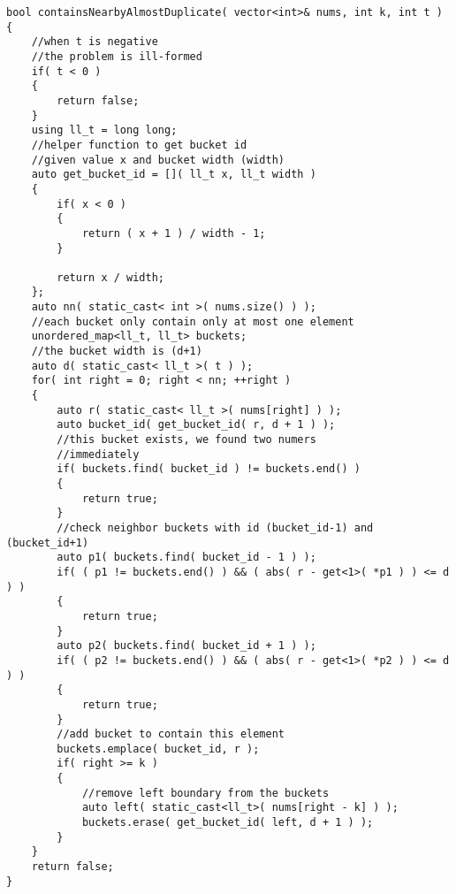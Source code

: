 \begin{lstlisting}[style=customc, caption={Buckets Sort}]
bool containsNearbyAlmostDuplicate( vector<int>& nums, int k, int t )
{
    //when t is negative
    //the problem is ill-formed
    if( t < 0 )
    {
        return false;
    }
    using ll_t = long long;
    //helper function to get bucket id
    //given value x and bucket width (width)
    auto get_bucket_id = []( ll_t x, ll_t width )
    {
        if( x < 0 )
        {
            return ( x + 1 ) / width - 1;
        }

        return x / width;
    };
    auto nn( static_cast< int >( nums.size() ) );
    //each bucket only contain only at most one element
    unordered_map<ll_t, ll_t> buckets;
    //the bucket width is (d+1)
    auto d( static_cast< ll_t >( t ) );
    for( int right = 0; right < nn; ++right )
    {
        auto r( static_cast< ll_t >( nums[right] ) );
        auto bucket_id( get_bucket_id( r, d + 1 ) );
        //this bucket exists, we found two numers
        //immediately
        if( buckets.find( bucket_id ) != buckets.end() )
        {
            return true;
        }
        //check neighbor buckets with id (bucket_id-1) and (bucket_id+1)
        auto p1( buckets.find( bucket_id - 1 ) );
        if( ( p1 != buckets.end() ) && ( abs( r - get<1>( *p1 ) ) <= d ) )
        {
            return true;
        }
        auto p2( buckets.find( bucket_id + 1 ) );
        if( ( p2 != buckets.end() ) && ( abs( r - get<1>( *p2 ) ) <= d ) )
        {
            return true;
        }
        //add bucket to contain this element
        buckets.emplace( bucket_id, r );
        if( right >= k )
        {
            //remove left boundary from the buckets
            auto left( static_cast<ll_t>( nums[right - k] ) );
            buckets.erase( get_bucket_id( left, d + 1 ) );
        }
    }
    return false;
}
\end{lstlisting}
